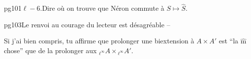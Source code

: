 
pg101\quad $\ell-6$.\quad Dire où on trouve que Néron commute à $S\mapsto\widehat S$.

pg103\quad Le renvoi au courage du lecteur est désagréable --

Si j'ai bien compris, tu affirme que prolonger une biextension à $A\times A'$ est ``la $\hat{\mathrm m}$ chose'' que de la prolonger aux ${}_{\ell^\infty}A\times{}_{\ell^\infty}A'$.

